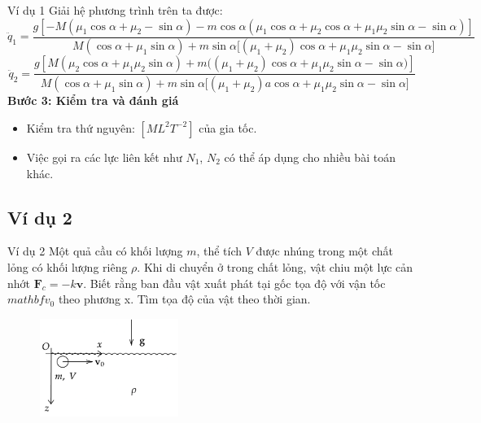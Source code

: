 \begin{frame}{Ví dụ 1}
    Giải hệ phương trình trên ta được:
    \begin{equation*}
    \ddot q_1 = \frac{ g\left[ -M(\mu_1\cos\alpha + \mu_2 - \sin\alpha) 
- m\cos\alpha(\mu_1\cos\alpha + \mu_2\cos\alpha + \mu_1\mu_2\sin\alpha - \sin\alpha) \right]}
{ M(\cos\alpha + \mu_1\sin\alpha) + m\sin\alpha\big[(\mu_1+\mu_2)\cos\alpha + \mu_1\mu_2\sin\alpha - \sin\alpha\big]}
    \end{equation*}
    \begin{equation*}
        \ddot q_2 = \frac{ g\left[ M(\mu_2\cos\alpha + \mu_1\mu_2\sin\alpha) 
+ m\big((\mu_1+\mu_2)\cos\alpha + \mu_1\mu_2\sin\alpha - \sin\alpha\big) \right]}
{ M(\cos\alpha + \mu_1\sin\alpha) + m\sin\alpha\big[(\mu_1+\mu_2)a\cos\alpha + \mu_1\mu_2\sin\alpha - \sin\alpha\big] }
    \end{equation*}
\textbf{Bước 3: Kiểm tra và đánh giá}
\begin{itemize}
    \item Kiểm tra thứ nguyên: \([ML^2T^{-2}]\) của gia tốc.
    \item Việc gọi ra các lực liên kết như \(N_1\), \(N_2\) có thể áp dụng cho nhiều bài toán khác.
\end{itemize}
\end{frame}

\subsection{Ví dụ 2}
\begin{frame}{Ví dụ 2}
    Một quả cầu có khối lượng \(m\), thể tích \(V\) được nhúng trong một chất lỏng có khối lượng riêng \(\rho\). Khi di chuyển ở trong chất lỏng, vật chiu một lực cản nhớt \(\mathbf F_c=-k\mathbf v\). Biết rằng ban đầu vật xuất phát tại gốc tọa độ với vận tốc \(mathbf v_0\) theo phương x. Tìm tọa độ của vật theo thời gian.
\begin{figure}
    \centering
    \includegraphics[width=0.4\textwidth]{Slides/Figure/masatnhot.png}
\end{figure}
\end{frame}

